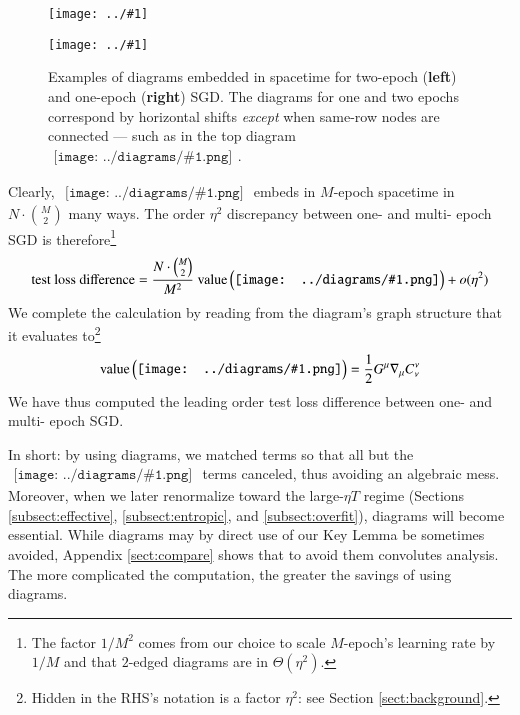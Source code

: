 \documentclass{article}
\theoremstyle{plain}
\theoremstyle{definition}
\newcommand{\dvalue}{\text{\textnormal{value}}}
\newcommand{\wrap}[1]{\left(#1\right)}
\newcommand{\plotmooh}[3]{
    \texttt{[image: ../\#1]}
}
\newcommand{\sdia}[1]{\begin{gathered}\texttt{[image: ../diagrams/\#1.png]}\end{gathered}}
\begin{document}
            \begin{figure}[h!] 
                \centering  
                \plotmooh{diagrams/spacetime-d}{}{0.35\columnwidth}
                \plotmooh{diagrams/spacetime-c}{}{0.35\columnwidth}
                \caption{
                    Examples of diagrams embedded in spacetime for two-epoch
                    ({\bf left}) and one-epoch ({\bf right}) SGD.  The diagrams
                    for one and two epochs correspond by horizontal shifts
                    \emph{except} when same-row nodes are connected --- such as
                    in the top diagram $\sdia{c(01-2)(01-12)}$. 
                }
                \label{fig:epoch}
            \end{figure}

            Clearly, $\sdia{c(01-2)(01-12)}$ embeds in $M$-epoch spacetime in
            $N\cdot{M\choose 2}$ many ways.  The order $\eta^2$ discrepancy
            between one- and multi- epoch SGD is therefore\footnote{
                The factor $1/M^2$ comes from our choice to scale $M$-epoch's
                learning rate by $1/M$ and that $2$-edged diagrams 
                are in $\Theta(\eta^2)$.
            }
            $$
                \text{test loss difference} =  
                \frac{N\cdot {M\choose 2}}{M^2}~
                \dvalue\wrap{\sdia{c(01-2)(01-12)}}
                + o(\eta^2)
            $$
            We complete the calculation by reading from the diagram's graph
            structure that it evaluates to\footnote{
                Hidden in the RHS's notation is a factor $\eta^2$: see  
                Section \ref{sect:background}.
            }
            \begin{align*}
                \dvalue\wrap{\sdia{c(01-2)(01-12)}}
                = 
                \frac{1}{2} G^\mu \nabla_\mu C^{\nu}_{\nu} 
            \end{align*}
            We have thus computed the leading order test loss difference
            between one- and multi- epoch SGD.

            In short: by using diagrams, we matched terms so that all but the
            $\sdia{c(01-2)(01-12)}$ terms canceled, thus avoiding an algebraic
            mess.  Moreover, when we later renormalize toward the large-$\eta
            T$ regime (Sections \ref{subsect:effective},
            \ref{subsect:entropic}, and \ref{subsect:overfit}), diagrams will
            become essential.  While diagrams may by direct use of our Key
            Lemma be sometimes avoided, Appendix \ref{sect:compare} shows that
            to avoid them convolutes analysis.  The more complicated the
            computation, the greater the savings of using diagrams.
\end{document}

